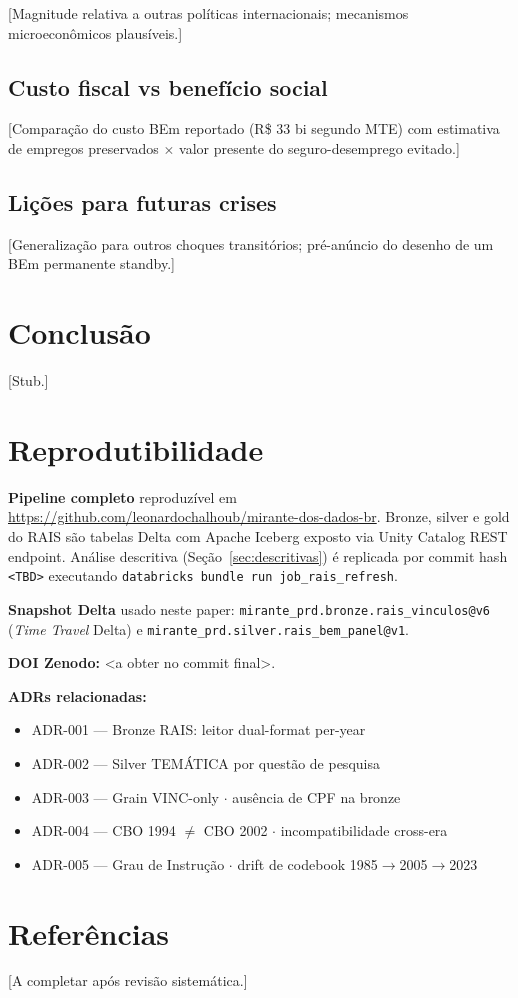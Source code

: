 \documentclass[12pt,a4paper,oneside]{article}
\begin{document}
[Magnitude relativa a outras políticas internacionais; mecanismos
microeconômicos plausíveis.]

\subsection{Custo fiscal vs benefício social}

[Comparação do custo BEm reportado (R\$ 33 bi segundo MTE) com
estimativa de empregos preservados $\times$ valor presente do
seguro-desemprego evitado.]

\subsection{Lições para futuras crises}

[Generalização para outros choques transitórios; pré-anúncio do
desenho de um BEm permanente standby.]

\section{Conclusão}

[Stub.]

\section*{Reprodutibilidade}

\textbf{Pipeline completo} reproduzível em
\url{https://github.com/leonardochalhoub/mirante-dos-dados-br}.
Bronze, silver e gold do RAIS são tabelas Delta com Apache Iceberg
exposto via Unity Catalog REST endpoint. Análise descritiva
(Seção~\ref{sec:descritivas}) é replicada por commit hash
\texttt{<TBD>} executando \texttt{databricks bundle run job\_rais\_refresh}.

\textbf{Snapshot Delta} usado neste paper:
\texttt{mirante\_prd.bronze.rais\_vinculos@v6} (\textit{Time Travel}
Delta) e \texttt{mirante\_prd.silver.rais\_bem\_panel@v1}.

\textbf{DOI Zenodo:} <a obter no commit final>.

\textbf{ADRs relacionadas:}
\begin{itemize}
  \item ADR-001 --- Bronze RAIS: leitor dual-format per-year
  \item ADR-002 --- Silver TEMÁTICA por questão de pesquisa
  \item ADR-003 --- Grain VINC-only $\cdot$ ausência de CPF na bronze
  \item ADR-004 --- CBO 1994 $\neq$ CBO 2002 $\cdot$ incompatibilidade cross-era
  \item ADR-005 --- Grau de Instrução $\cdot$ drift de codebook 1985$\to$2005$\to$2023
\end{itemize}

\section*{Referências}

[A completar após revisão sistemática.]
\end{document}
